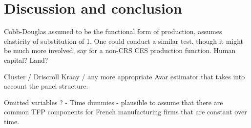 \section{Discussion and conclusion}

Cobb-Douglas assumed to be the functional form of production, assumes elasticity of substitution of 1. One could conduct a similar test, though it might be much more involved, say for a non-CRS CES production function. Human capital? Land? 

Cluster / Driscroll Kraay / any more appropriate Avar estimator that takes into account the panel structure. 

Omitted variables ? - Time dummies -\> plausible to assume that there are common TFP components for French manufacturing firms that are constant over time. 

